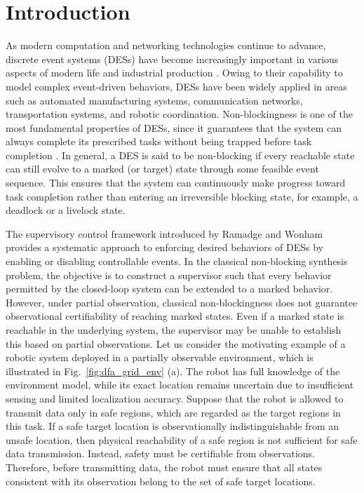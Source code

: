 \documentclass[final,5p,times,twocolumn,authoryear]{elsarticle}
\begin{document}
\section{Introduction}
\label{sec:intro}
As modern computation and networking technologies continue to advance, discrete event systems (DESs) have become increasingly important in various aspects of modern life and industrial production \cite{yin2024formal, fokkink2024offline}.
Owing to their capability to model complex event-driven behaviors, DESs have been widely applied in areas such as automated manufacturing systems, communication networks, transportation systems, and robotic coordination.
%
Non-blockingness is one of the most fundamental properties of DESs, since it guarantees that the system can always complete its prescribed tasks without being trapped before task completion \cite{cassandras2021introduction}.
In general, a DES is said to be non-blocking if every reachable state can still evolve to a marked (or target) state through some feasible event sequence.
This ensures that the system can continuously make progress toward task completion rather than entering an irreversible blocking state, for example, a deadlock or a livelock state.

%
The supervisory control framework introduced by Ramadge and Wonham \cite{ramadge1987supervisory} provides a systematic approach to enforcing desired behaviors of DESs by enabling or disabling controllable events.
In the classical non-blocking synthesis problem, the objective is to construct a supervisor such that every behavior permitted by the closed-loop system can be extended to a marked behavior.
%
However, under partial observation, classical non-blockingness does not guarantee observational certifiability of reaching marked states. Even if a marked state is reachable in the underlying system, the supervisor may be unable to establish this based on partial observations.
%
Let us consider the motivating example of a robotic system deployed in a partially observable environment, which is illustrated in Fig.~\ref{fig:dfa_grid_env} (a). 
The robot has full knowledge of the environment model, while its exact location remains uncertain due to insufficient sensing and limited localization accuracy.
Suppose that the robot is allowed to transmit data only in safe regions, which are regarded as the target regions in this task. 
If a safe target location is observationally indistinguishable from an unsafe location, then physical reachability of a safe region is not sufficient for safe data transmission.
Instead, safety must be certifiable from observations.
Therefore, before transmitting data, the robot must ensure that all states consistent with its observation belong to the set of safe target locations.
\end{document}
